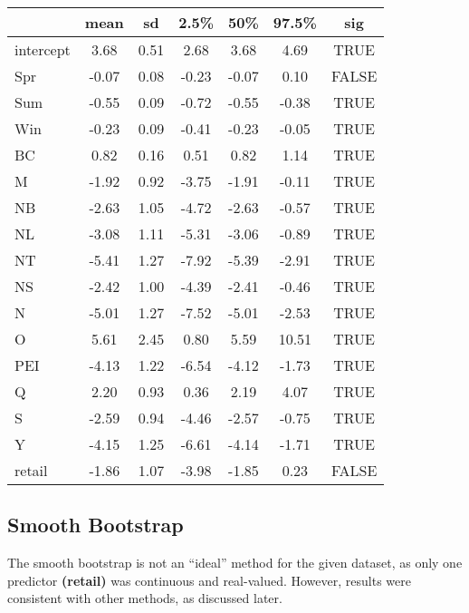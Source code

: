 \documentclass[12pt]{article}
\begin{document}
\begin{table}[hbt!]
  \centering
  \begin{tabular}{|l|c|c|c|c|c|c|}
    \hline
              & mean  & sd   & 2.5\% & 50\%  & 97.5\% & sig   \\
    \hline
    intercept & 3.68  & 0.51 & 2.68  & 3.68  & 4.69   & TRUE  \\
    Spr       & -0.07 & 0.08 & -0.23 & -0.07 & 0.10   & FALSE \\
    Sum       & -0.55 & 0.09 & -0.72 & -0.55 & -0.38  & TRUE  \\
    Win       & -0.23 & 0.09 & -0.41 & -0.23 & -0.05  & TRUE  \\
    BC        & 0.82  & 0.16 & 0.51  & 0.82  & 1.14   & TRUE  \\
    M         & -1.92 & 0.92 & -3.75 & -1.91 & -0.11  & TRUE  \\
    NB        & -2.63 & 1.05 & -4.72 & -2.63 & -0.57  & TRUE  \\
    NL        & -3.08 & 1.11 & -5.31 & -3.06 & -0.89  & TRUE  \\
    NT        & -5.41 & 1.27 & -7.92 & -5.39 & -2.91  & TRUE  \\
    NS        & -2.42 & 1.00 & -4.39 & -2.41 & -0.46  & TRUE  \\
    N         & -5.01 & 1.27 & -7.52 & -5.01 & -2.53  & TRUE  \\
    O         & 5.61  & 2.45 & 0.80  & 5.59  & 10.51  & TRUE  \\
    PEI       & -4.13 & 1.22 & -6.54 & -4.12 & -1.73  & TRUE  \\
    Q         & 2.20  & 0.93 & 0.36  & 2.19  & 4.07   & TRUE  \\
    S         & -2.59 & 0.94 & -4.46 & -2.57 & -0.75  & TRUE  \\
    Y         & -4.15 & 1.25 & -6.61 & -4.14 & -1.71  & TRUE  \\
    retail    & -1.86 & 1.07 & -3.98 & -1.85 & 0.23   & FALSE \\
    \hline
  \end{tabular}
\end{table}
\subsection{Smooth Bootstrap}
The smooth bootstrap is not an ``ideal'' method for the given dataset, as only one predictor \textbf{(retail)} was continuous and real-valued. However, results were consistent with other methods, as discussed later.
\end{document}
